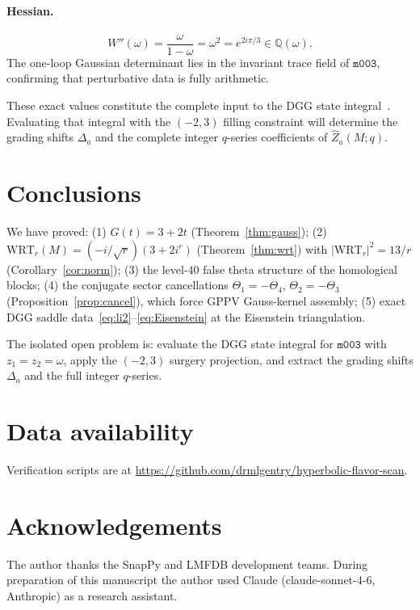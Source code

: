 \documentclass[11pt,a4paper]{article}
\theoremstyle{definition}
\theoremstyle{remark}
\newcommand{\Q}{\mathbb{Q}}
\newcommand{\WRT}{\mathrm{WRT}}
\newcommand{\mfld}[1]{\texttt{#1}}
\begin{document}
\paragraph{Hessian.}
\begin{equation}
W''(\omega)=\frac{\omega}{1-\omega}=\omega^2=e^{2i\pi/3}\in\Q(\omega).
\end{equation}
The one-loop Gaussian determinant lies in the invariant trace
field of $\mfld{m003}$, confirming that perturbative data
is fully arithmetic.

These exact values constitute the complete input to the DGG state
integral~\cite{DGG}. Evaluating that integral with the $(-2,3)$
filling constraint will determine the grading shifts $\Delta_a$
and the complete integer $q$-series coefficients of $\hat Z_a(M;q)$.

\section{Conclusions}

We have proved:
(1) $G(t)=3+2t$ (Theorem~\ref{thm:gauss});
(2) $\WRT_r(M)=(-i/\sqrt{r})(3+2i^r)$ (Theorem~\ref{thm:wrt})
with $|\WRT_r|^2=13/r$ (Corollary~\ref{cor:norm});
(3) the level-$40$ false theta structure of the homological blocks;
(4) the conjugate sector cancellations $\Theta_1=-\Theta_4$,
$\Theta_2=-\Theta_3$ (Proposition~\ref{prop:cancel}),
which force GPPV Gauss-kernel assembly;
(5) exact DGG saddle data~\eqref{eq:li2}--\eqref{eq:Eisenstein}
at the Eisenstein triangulation.

The isolated open problem is: evaluate the DGG state integral for
$\mfld{m003}$ with $z_1=z_2=\omega$, apply the $(-2,3)$ surgery
projection, and extract the grading shifts $\Delta_a$ and the full
integer $q$-series.

\section*{Data availability}
Verification scripts are at
\url{https://github.com/drmlgentry/hyperbolic-flavor-scan}.

\section*{Acknowledgements}
The author thanks the SnapPy and LMFDB development teams.
During preparation of this manuscript the author used
Claude (claude-sonnet-4-6, Anthropic) as a research assistant.
\end{document}
